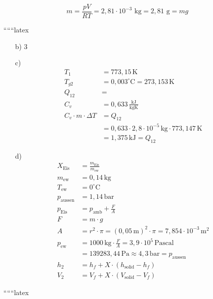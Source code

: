 \[
m = \frac{pV}{RT} = 2,81 \cdot 10^{-3} \text{ kg} = 2,81 \text{ g} = mg
\]

``````latex


\begin{itemize}
    \item[b)] \textcircled{3}
    
    \item[c)] 
    \begin{align*}
        T_1 &= 773,15 \, \text{K} \\
        T_{g2} &= 0,003^\circ \text{C} = 273,153 \, \text{K} \\
        Q_{12} &= \\
        C_v &= 0,633 \, \frac{\text{kJ}}{\text{kgK}} \\
        C_v \cdot m \cdot \Delta T &= Q_{12} \\
        &= 0,633 \cdot 2,8 \cdot 10^{-5} \, \text{kg} \cdot 773,147 \, \text{K} \\
        &= 1,375 \, \text{kJ} = Q_{12}
    \end{align*}
    
    \item[d)] 
    \begin{align*}
        X_{\text{Eis}} &= \frac{m_{\text{Eis}}}{m_{\text{ew}}} \\
        m_{\text{ew}} &= 0,14 \, \text{kg} \\
        T_{\text{ew}} &= 0^\circ \text{C} \\
        p_{\text{aussen}} &= 1,14 \, \text{bar} \\
        p_{\text{Eis}} &= p_{\text{amb}} + \frac{F}{A} \\
        F &= m \cdot g \\
        A &= r^2 \cdot \pi = (0,05 \, \text{m})^2 \cdot \pi = 7,854 \cdot 10^{-3} \, \text{m}^2 \\
        p_{\text{ew}} &= 1000 \, \text{kg} \cdot \frac{F}{A} = 3,9 \cdot 10^5 \, \text{Pascal} \\
        &= 139283,44 \, \text{Pa} \approx 4,3 \, \text{bar} = p_{\text{aussen}} \\
        h_2 &= h_f + X \cdot (h_{\text{solid}} - h_f) \\
        V_2 &= V_f + X \cdot (V_{\text{solid}} - V_f)
    \end{align*}
\end{itemize}

``````latex


